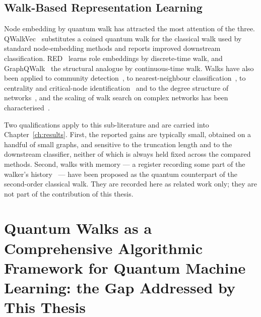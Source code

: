 \subsection{Walk-Based Representation Learning}
Node embedding by quantum walk has attracted the most attention of the three.
QWalkVec~\cite{10.1007/978-981-97-2242-6_8} substitutes a coined quantum walk
for the classical walk used by standard node-embedding methods and reports
improved downstream classification. RED~\cite{Wang_2021} learns role embeddings
by discrete-time walk, and GraphQWalk~\cite{Liu_2026} the structural analogue by
continuous-time walk. Walks have also been applied to community
detection~\cite{Mukai_2020, He_2025}, to nearest-neighbour
classification~\cite{Enrico_2024}, to centrality and critical-node
identification~\cite{Wang_2025, Liang_2022, Wang_2022, Berry_2010} and to the
degree structure of networks~\cite{Faccin_2013}, and the scaling of walk search
on complex networks has been characterised~\cite{Sato_2024b}.

Two qualifications apply to this sub-literature and are carried into
Chapter~\ref{ch:results}. First, the reported gains are typically small,
obtained on a handful of small graphs, and sensitive to the truncation length
and to the downstream classifier, neither of which is always held fixed across
the compared methods. Second, walks with memory --- a register recording some
part of the walker's history~\cite{Flitney_2003, McGettrick_2009, Gettrick_2014,
Krawec_2014, Zhou_2019, Li_2020a, Shakeel_2019, Camilleri_2014,
PhysRevA.87.052302, PhysRevA.106.062215, 2011451.2011461} --- have been proposed
as the quantum counterpart of the second-order classical walk. They are recorded
here as related work only; they are not part of the contribution of this thesis.


\section{Quantum Walks as a Comprehensive Algorithmic Framework for Quantum Machine Learning: the Gap Addressed by This Thesis}
\label{sec:lr-gap}

